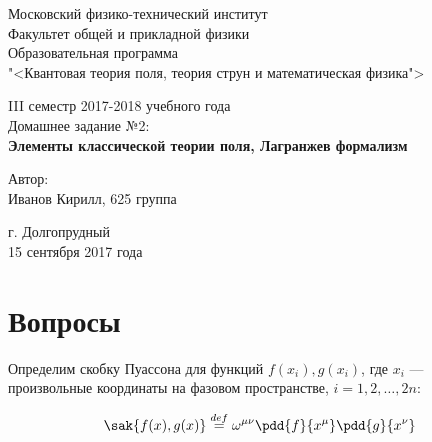 \documentclass[12pt]{kiarticle}
\newcommand{\deff}{\ensuremath{\stackrel{def}{=}}}
\begin{document}
\begin{titlepage}		
	\begin{center}
		\large 	Московский физико-технический институт \\
		Факультет общей и прикладной физики \\
		\vspace{0.2cm}
		Образовательная программа\\
		"<Квантовая теория поля, теория струн и математическая физика">
		
		\vspace{4.5cm}
		III семестр 2017-2018 учебного года \\ \vspace{0.1cm}
		\large Домашнее задание №2: \\ \vspace{0.1cm}
		\LARGE \textbf{Элементы классической теории поля, Лагранжев формализм}
	\end{center}
	\vspace{2.3cm} \large
	
	\begin{center}
		Автор: \\
		Иванов Кирилл,
		625 группа
		\vspace{10mm}
		
		
	\end{center}
	
	\begin{center} \vspace{50mm}
		г. Долгопрудный \\ 
		15 сентября 2017 года
	\end{center}
\end{titlepage}



%
%
%
%

\section{Вопросы}

Определим скобку Пуассона для функций $ f(x_i), g(x_i) $, где $ x_i $ --- произвольные координаты на фазовом пространстве, $ i = 1, 2, \dots, 2n $:

\begin{equation}\label{}
\sak{f(x), g(x)} \deff \omega^{\mu\nu} \pdd{f}{x^\mu}\pdd{g}{x^\nu}
\end{equation}
\end{document}
